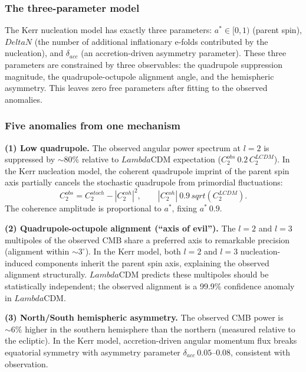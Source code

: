 \documentclass[11pt]{article}
\def\ell{l}%
\def\Delta{Delta}%
\def\Lambda{Lambda}%
\def\mathrm#1{#1}%
\def\sqrt#1{sqrt(#1)}%
\def\approx{~}%
\begin{document}
\subsubsection{The three-parameter model}

The Kerr nucleation model has exactly three parameters: $a^* \in [0, 1)$ (parent spin), $\Delta N$ (the number of additional inflationary e-folds contributed by the nucleation), and $\delta_{\mathrm{acc}}$ (an accretion-driven asymmetry parameter). These three parameters are constrained by three observables: the quadrupole suppression magnitude, the quadrupole-octupole alignment angle, and the hemispheric asymmetry. This leaves zero free parameters after fitting to the observed anomalies.

\subsubsection{Five anomalies from one mechanism}

\textbf{(1) Low quadrupole.} The observed angular power spectrum at $\ell = 2$ is suppressed by $\sim 80\%$ relative to $\Lambda$CDM expectation ($C_2^{\mathrm{obs}} \approx 0.2\,C_2^{\mathrm{LCDM}}$). In the Kerr nucleation model, the coherent quadrupole imprint of the parent spin axis partially cancels the stochastic quadrupole from primordial fluctuations:
\begin{equation}
C_2^{\mathrm{obs}} = C_2^{\mathrm{stoch}} - |C_2^{\mathrm{coh}}|^2, \qquad |C_2^{\mathrm{coh}}| \approx 0.9\,\sqrt{C_2^{\mathrm{LCDM}}}.
\end{equation}
The coherence amplitude is proportional to $a^*$, fixing $a^* \approx 0.9$.

\textbf{(2) Quadrupole-octupole alignment (``axis of evil'').} The $\ell = 2$ and $\ell = 3$ multipoles of the observed CMB share a preferred axis to remarkable precision (alignment within $\sim 3^\circ$). In the Kerr model, both $\ell = 2$ and $\ell = 3$ nucleation-induced components inherit the parent spin axis, explaining the observed alignment structurally. $\Lambda$CDM predicts these multipoles should be statistically independent; the observed alignment is a 99.9\% confidence anomaly in $\Lambda$CDM.

\textbf{(3) North/South hemispheric asymmetry.} The observed CMB power is $\sim 6\%$ higher in the southern hemisphere than the northern (measured relative to the ecliptic). In the Kerr model, accretion-driven angular momentum flux breaks equatorial symmetry with asymmetry parameter $\delta_{\mathrm{acc}} \approx 0.05$--$0.08$, consistent with observation.
\end{document}
